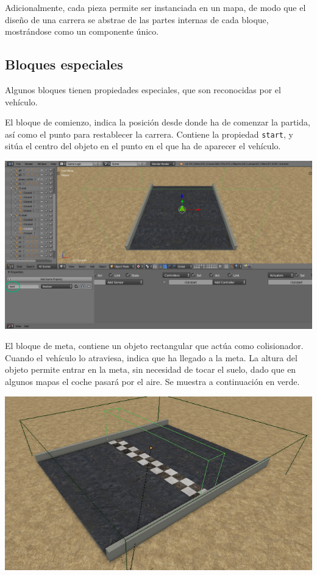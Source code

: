 \documentclass[11pt,a4paper,hidelinks]{article}
\begin{document}
Adicionalmente, cada pieza permite ser instanciada en un mapa, de modo que el 
diseño de una carrera se abstrae de las partes internas de cada bloque, 
mostrándose como un componente único.

\subsection{Bloques especiales}
Algunos bloques tienen propiedades especiales, que son reconocidas por el 
vehículo.

El bloque de comienzo, indica la posición desde donde ha de comenzar la partida, 
así como el punto para restablecer la carrera. Contiene la propiedad 
\texttt{start}, y sitúa el centro del objeto en el punto en el que ha de 
aparecer el vehículo.

\includegraphics[width=\textwidth]{start}

El bloque de meta, contiene un objeto rectangular que actúa como colisionador.  
Cuando el vehículo lo atraviesa, indica que ha llegado a la meta. La altura del 
objeto permite entrar en la meta, sin necesidad de tocar el suelo, dado que en 
algunos mapas el coche pasará por el aire. Se muestra a continuación en verde.

\includegraphics[width=\textwidth]{end}
\end{document}
